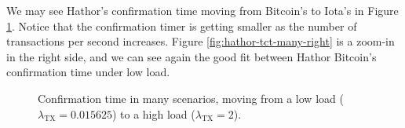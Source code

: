 We may see Hathor's confirmation time moving from Bitcoin's to Iota's in Figure \ref{fig:hathor-tct-many}. Notice that the confirmation timer is getting smaller as the number of transactions per second increases. Figure \ref{fig:hathor-tct-many-right} is a zoom-in in the right side, and we can see again the good fit between Hathor Bitcoin's confirmation time under low load.

\begin{figure}[!htb]
\centering
{}


\caption{Confirmation time in many scenarios, moving from a low load ($\lambda_\text{TX} = 0.015625$) to a high load ($\lambda_\text{TX} = 2$). \label{fig:hathor-tct-many}}
\end{figure}


